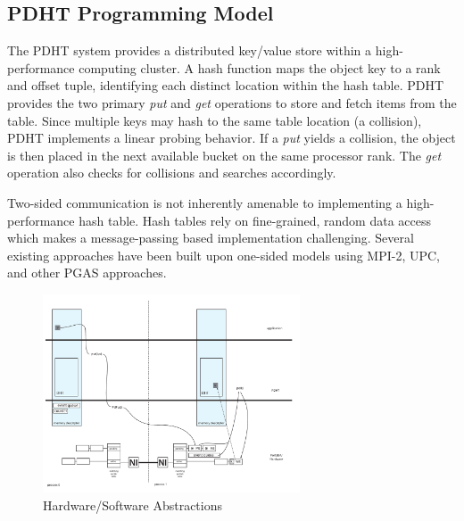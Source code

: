 \subsection{PDHT Programming Model}


 
The PDHT system provides a distributed key/value store within a
high-performance computing cluster. A hash function maps the object
key to a rank and offset tuple, identifying each distinct location
within the hash table. PDHT provides the two primary {\em put} and
{\em get} operations to store and fetch items from the table. Since
multiple keys may hash to the same table location (a collision), PDHT
implements a linear probing behavior. If a {\em put} yields a
collision, the object is then placed in the next available bucket on
the same processor rank. The {\em get} operation also checks for
collisions and searches accordingly. 

Two-sided communication is not inherently amenable to implementing a
high-performance hash table. Hash tables rely on fine-grained, random
data access which makes a message-passing based implementation
challenging. Several existing approaches have been built upon
one-sided models using MPI-2, UPC, and other PGAS approaches.

\begin{figure}[ht]
  \centering
  \includegraphics[width=3in]{figs/hwsw}
  \caption{Hardware/Software Abstractions}
  \label{fig:hwsw}
\end{figure}

